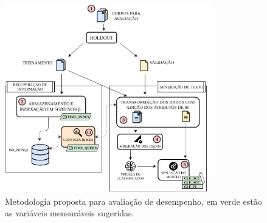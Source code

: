\begin{figure}[H]
    \centering
    \caption{Metodologia proposta para avaliação de desempenho, em verde estão as variáveis mensuráveis sugeridas.}
    \begin{center}
        \includegraphics[width=0.8\textwidth]{img/diagrama-metodologia-v2-2.png}
    \end{center}
    \vspace{-0.5cm}
    \label{fig:diagrama-da-metodologia}
\end{figure}